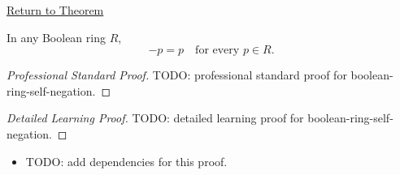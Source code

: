 \newpage
{}
\label{prf:boolean-ring-self-negation}

\begin{remark*}[Return]
\hyperref[prop:boolean-ring-self-negation]{Return to Theorem}
\end{remark*}

\begin{proposition*}
In any Boolean ring $R$,
\[
  -p=p \quad \text{for every } p\in R.
\]
\end{proposition*}

\begin{proof}[Professional Standard Proof]
\LRAProofBodyStart
TODO: professional standard proof for boolean-ring-self-negation.
\end{proof}

\begin{proof}[Detailed Learning Proof]
\LRAProofBodyStart
TODO: detailed learning proof for boolean-ring-self-negation.
\end{proof}

\begin{remark*}
\end{remark*}

\begin{dependencies}
\begin{itemize}
  \item TODO: add dependencies for this proof.
\end{itemize}
\end{dependencies}

\clearpage
